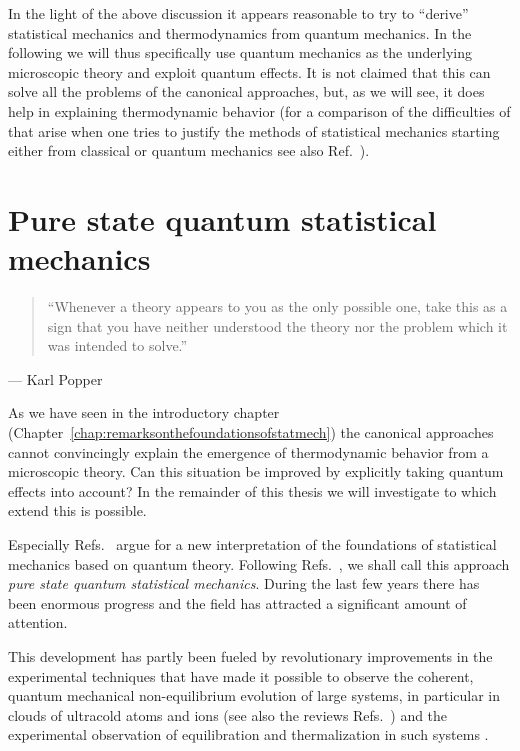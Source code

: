 \documentclass[a4paper,12pt,listof=totoc,index=totoc,bibliography=totoc,headsepline=false,headings=normal,BCOR16.153846mm,DIV12,headinclude,twoside,cleardoublepage=empty,numbers=noenddot,final]{scrreprt}
\theoremstyle{mystyle}
\numberwithin{equation}{section}
\numberwithin{figure}{section}
\numberwithin{lemma}{section}
\numberwithin{theorem}{section}
\numberwithin{corollary}{section}
\numberwithin{definition}{section}
\numberwithin{conjecture}{section}
\numberwithin{observation}{section}
\newcommand{\+}{\mkern2mu}
\DeclareMathOperator{\1}{\mathds{1}}
\begin{document}
In the light of the above discussion it appears reasonable to try to ``derive'' statistical mechanics and thermodynamics from quantum mechanics.
In the following we will thus specifically use quantum mechanics as the underlying microscopic theory and exploit quantum effects.
It is not claimed that this can solve all the problems of the canonical approaches, but, as we will see, it does help in explaining thermodynamic behavior (for a comparison of the difficulties of that arise when one tries to justify the methods of statistical mechanics starting either from classical or quantum mechanics see also Ref.~\cite{Reimann2013}).

\cleardoublepage

\chapter{Pure state quantum statistical mechanics}
\label{sec:quantumstatisticalmechanics}
%
\begin{quotation}
  ``Whenever a theory appears to you as the only possible one, take this as a sign that you have neither understood the theory nor the problem which it was intended to solve.''
\end{quotation}
\begin{flushright}
  --- Karl Popper
\end{flushright}

As we have seen in the introductory chapter (Chapter~\ref{chap:remarksonthefoundationsofstatmech}) the canonical approaches cannot convincingly explain the emergence of thermodynamic behavior from a microscopic theory.
Can this situation be improved by explicitly taking quantum effects into account?
In the remainder of this thesis we will investigate to which extend this is possible.

Especially Refs.~\cite{slloydthesis,PhysRevA.43.20,PhysRevE.50.88,Popescu05,Popescu06,Gemmer09} argue for a new interpretation of the foundations of statistical mechanics based on quantum theory.
Following Refs.~\cite{slloydthesis,lloyed13}, we shall call this approach \emph{pure state quantum statistical mechanics}.
During the last few years there has been enormous progress and the field has attracted a significant amount of attention.

This development has partly been fueled by revolutionary improvements in the experimental techniques that have made it possible to observe the coherent, quantum mechanical non-equilibrium evolution of large systems, in particular in clouds of ultracold atoms and ions \cite{Haffner2005,Greiner2002a,Greiner2002,Sadler2006,Regal2006,Tuchman2006,Aidelsburger2011,Bloch2005,Kinoshita2006,Hofferberth2007,Weller2008,Strohmaier2007} (see also the reviews Refs.~\cite{Bloch2008,Yukalov2011}) and the experimental observation of equilibration and thermalization in such systems \cite{1101.2659v1,1111.0776v1,Langen2013,1112.0013v1,Langen2013a}.
\end{document}

